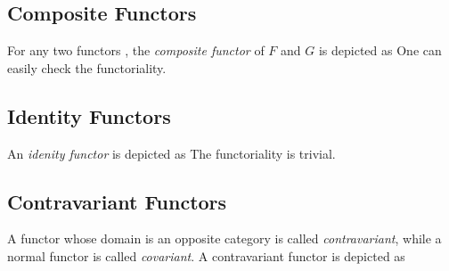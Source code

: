 \subsection{Composite Functors}

For any two functors 
, the \textit{composite functor} of $F$ and $G$
is depicted as 
One can easily check the functoriality.


\subsection{Identity Functors}

An \textit{idenity functor}
is depicted as
The functoriality is trivial.



\subsection{Contravariant Functors}

A functor whose domain is an opposite category
is called \textit{contravariant}, while a normal functor is called \textit{covariant}.
A contravariant functor is depicted as


